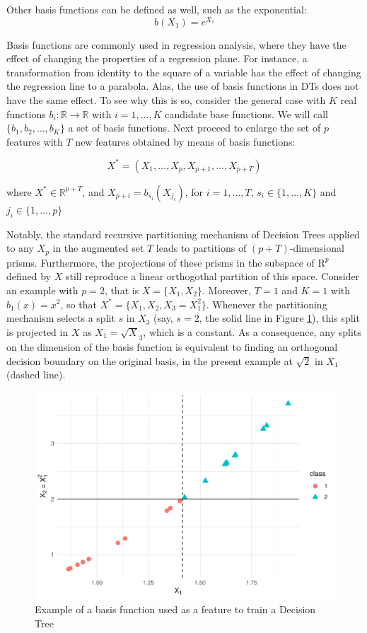 \documentclass[]{elsarticle} %
\makeatletter
\def\maxwidth{\ifdim\Gin@nat@width>\linewidth\linewidth
\else\Gin@nat@width\fi}
\let\Oldincludegraphics\includegraphics
\renewcommand{\includegraphics}[1]{\Oldincludegraphics[width=\maxwidth]{#1}}
\makeatother
\begin{document}
Other basis functions can be defined as well, such as the exponential:
\[
b(X_1) = e^{X_1}
\]

Basis functions are commonly used in regression analysis, where they
have the effect of changing the properties of a regression plane. For
instance, a transformation from identity to the square of a variable has
the effect of changing the regression line to a parabola. Alas, the use
of basis functions in DTs does not have the same effect. To see why this
is so, consider the general case with \(K\) real functions
\(b_{i}:\mathbb{R}\rightarrow\mathbb{R}\) with \(i=1,\dots,K\) candidate
base functions. We will call \(\{b_1,b_2,\dots, b_K\}\) a set of basis
functions. Next proceed to enlarge the set of \(p\) features with \(T\)
new features obtained by means of basis functions:

\[
X^{\ast }=\left( X_{1},\dots,X_{p},X_{p+1},\dots ,X_{p+T} \right)
\]

where \(X^{\ast }\in \mathbb{R}^{p+T}\), and
\(X_{p+i}=b_{s_i}( X_{j_i})\), for \(i=1,\dots ,T\),
\(s_i\in \{1,\dots,K\}\) and \(j_i\in\{1,\dots,p\}\)

Notably, the standard recursive partitioning mechanism of Decision Trees
applied to any \(X_p\) in the augmented set \(T\) leads to partitions of
\(\left(p+T\right)\)-dimensional prisms. Furthermore, the projections of
these prisms in the subspace of \(\mathrm{R}^{p}\) defined by \(X\)
still reproduce a linear orthogothal partition of this space. Consider
an example with \(p=2\), that is \(X=\{X_1,X_2\}\). Moreover, \(T=1\)
and \(K=1\) with \(b_1(x)=x^2\), so that
\(X^\ast=\{X_1,X_2,X_3=X_1^2\}\). Whenever the partitioning mechanism
selects a split \(s\) in \(X_3\) (say, \(s=2\), the solid line in Figure
\ref{fig:fig3-simple-basis}), this split is projected in \(X\) as
\(X_1=\sqrt X_3\), which is a constant. As a consequence, any splits on
the dimension of the basis function is equivalent to finding an
orthogonal decision boundary on the original basis, in the present
example at \(\sqrt 2\) in \(X_1\) (dashed line).

\begin{figure}
\centering
\includegraphics{Trees_with_Base_Functions_v2_files/figure-latex/fig3-simple-basis-1.pdf}
\caption{\label{fig:fig3-simple-basis}Example of a basis function used
as a feature to train a Decision Tree}
\end{figure}
\end{document}
